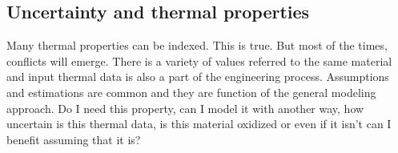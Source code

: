 \documentclass[final]{cubedoc}
\begin{document}

\subsection{Uncertainty and thermal properties}



Many thermal properties can be indexed. This is true. But most of the times, conflicts will emerge. There is a variety of values referred to the same material and input thermal data is also a part of the engineering process. Assumptions and estimations are  common and they are function of the general modeling approach. Do I need this property, can I model it with another way, how uncertain is this thermal data, is this material oxidized or even if it isn't can I benefit assuming that it is? 
\end{document}
